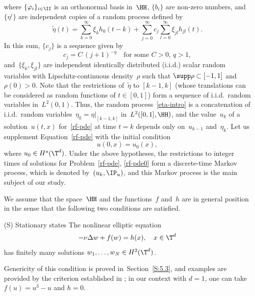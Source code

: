 where $\{\varphi_i\}_{i\in\II}$ is an orthonormal basis in~$\HH$, $\{b_i\}$ are non-zero numbers, and~$\{\eta^i\}$ are independent copies of a random process defined by
\begin{equation} \label{0.3}
\tilde\eta(t)=\sum_{k=0}^\infty \xi_k h_0(t-k)
+\sum_{j=0}^\infty c_j\sum_{l=0}^\infty \xi_{jl}h_{jl}(t).
\end{equation}
In this sum, $\{c_j\}$ is a sequence given by
\begin{equation}\label{cj}
c_j=C\,(j+1)^{-q}\quad \text{for some $C>0$, $q>1$},
\end{equation}
and~$\{\xi_k,\xi_{jl}\}$ are independent identically distributed (i.i.d.) scalar random variables with Lipschitz-continuous density~$\rho$ such that $ \supp\rho\subset[-1,1]$ and $\rho(0)>0$. Note that the restrictions of~$\tilde\eta$ to $[k-1,k]$ (whose translations can be considered as random functions of $t\in[0,1]$) form a sequence of i.i.d.\ random variables in~$L^2(0,1)$. Thus, the random process~\eqref{eta-intro} is a concatenation of i.i.d.\ random variables~$\eta_k=\eta|_{[k-1,k]}$ in~$L^2([0,1],\HH)$, and the value~$u_k$ of a solution~$u(t,x)$ for~\eqref{rf-pde} at time $t=k$ depends only on~$u_{k-1}$ and~$\eta_k$. Let us supplement Equation~\eqref{rf-pde} with the initial condition
\begin{equation}\label{rf-pde0}
u(0,x)=u_0(x),
\end{equation}
where $u_0\in H^s(\T^d)$. Under the above hypotheses, the restrictions to integer times of solutions for Problem~\eqref{rf-pde}, \eqref{rf-pde0} form a discrete-time Markov process, which is denoted by~$(u_k,\IP_u)$, and this Markov process is the main subject of our study.

We assume that the space~$\HH$ and the functions~$f$ and~$h$ are in general position in the sense that the following two conditions are satisfied.
\begin{enonce*}{\hypertarget{S}{(S)} Stationary states}
The nonlinear elliptic equation
\begin{equation} \label{stationary-eq}
-\nu\Delta w+f(w)=h(x), \quad x\in\T^d
\end{equation}
has finitely many solutions $w_1,\dots,w_N\in H^2(\T^d)$.
\end{enonce*}

Genericity of this condition is proved in~Section~\ref{S:5.3}, and examples are provided by the criterion established in \cite[\S 5]{CI-1974}; \eg in our context with $d=1$, one can take $f(u)=u^3-u$ and $h=0$.

